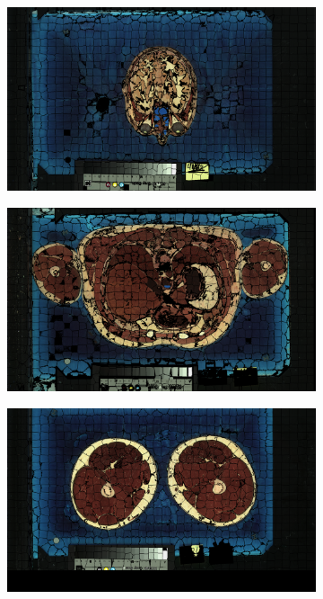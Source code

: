 \documentclass{InsightArticle}
\begin{document}
\begin{figure}
\centering
\begin{subfigure}{0.67\textwidth}
  \includegraphics[width=1.0\textwidth]{images/vh_slic_masked_110.png}
  \label{fig:a}
\end{subfigure}
\begin{subfigure}{0.67\textwidth}
  \includegraphics[width=1.0\textwidth]{images/vh_slic_masked_487.png}
  \label{fig:b}
\end{subfigure}
\begin{subfigure}{0.67\textwidth}
  \includegraphics[width=1.0\textwidth]{images/vh_slic_masked_1116.png}

\end{subfigure}
\end{figure}
\end{document}
